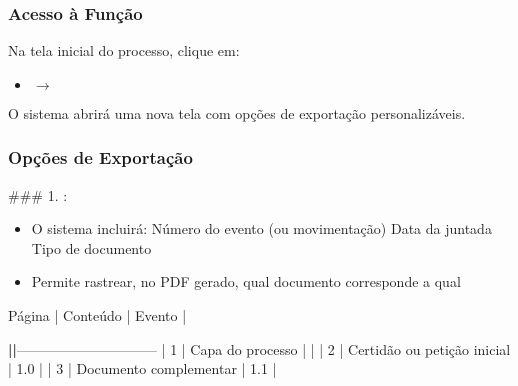 \documentclass[letterpaper,10pt,brazil]{sphinxmanual}
\begin{document}
\subsubsection{Acesso à Função}
\label{\detokenize{projud_18_exportarprocesso:acesso-a-funcao}}
\sphinxAtStartPar
Na tela inicial do processo, clique em:
\begin{itemize}
\item {} 
\sphinxAtStartPar
{} \(\rightarrow\) 

\end{itemize}

\sphinxAtStartPar
O sistema abrirá uma nova tela com opções de exportação personalizáveis.


\subsubsection{Opções de Exportação}
\label{\detokenize{projud_18_exportarprocesso:opcoes-de-exportacao}}
\sphinxAtStartPar
\#\#\# 1. : 
\begin{itemize}
\item {} 
\sphinxAtStartPar
O sistema incluirá:
\sphinxhyphen{} 
\sphinxhyphen{} Número do evento (ou movimentação)
\sphinxhyphen{} Data da juntada
\sphinxhyphen{} Tipo de documento

\item {} 
\sphinxAtStartPar
Permite rastrear, no PDF gerado, qual documento corresponde a qual 

\end{itemize}

\sphinxAtStartPar
{}

\begin{DUlineblock}{0em}
\item[] Página | Conteúdo                      | Evento       |
\end{DUlineblock}

\sphinxAtStartPar
{\color{red}\bfseries{}|\sphinxhyphen{}\sphinxhyphen{}\sphinxhyphen{}\sphinxhyphen{}\sphinxhyphen{}\sphinxhyphen{}\sphinxhyphen{}\sphinxhyphen{}|}——————————\sphinxhyphen{}{\color{red}\bfseries{}|\sphinxhyphen{}\sphinxhyphen{}\sphinxhyphen{}\sphinxhyphen{}\sphinxhyphen{}\sphinxhyphen{}\sphinxhyphen{}\sphinxhyphen{}\sphinxhyphen{}\sphinxhyphen{}\sphinxhyphen{}\sphinxhyphen{}\sphinxhyphen{}\sphinxhyphen{}|}
| 1      | Capa do processo              | \sphinxhyphen{}            |
| 2      | Certidão ou petição inicial   | 1.0          |
| 3      | Documento complementar        | 1.1          |
\end{document}
